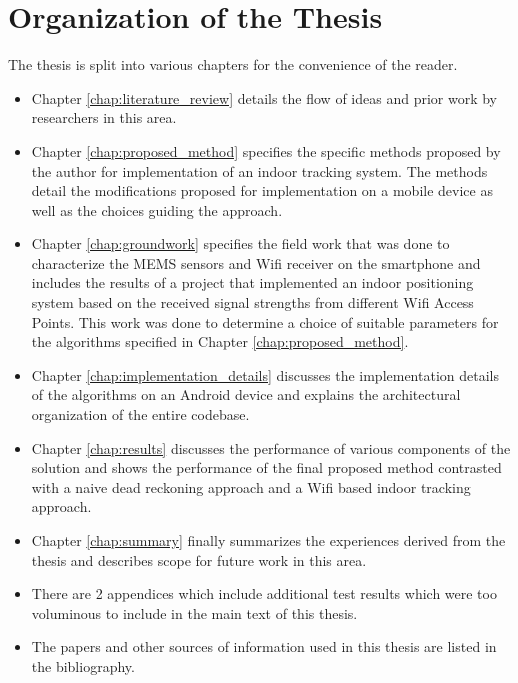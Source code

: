 \section{Organization of the Thesis}

The thesis is split into various chapters for the convenience of the reader.

\begin{itemize}
\item Chapter \ref{chap:literature_review} details the flow of ideas and prior
work by researchers in this area.

\item Chapter \ref{chap:proposed_method} specifies the specific methods proposed
by the author for implementation of an indoor tracking system. The methods
detail the modifications proposed for implementation on a mobile device as well
as the choices guiding the approach.

\item Chapter \ref{chap:groundwork} specifies the field work that was done to
characterize the MEMS sensors and Wifi receiver on the smartphone and includes
the results of a project that implemented an indoor positioning system based on
the received signal strengths from different Wifi Access Points. This work was
done to determine a choice of suitable parameters for the algorithms specified
in Chapter \ref{chap:proposed_method}.

\item Chapter \ref{chap:implementation_details} discusses the implementation
details of the algorithms on an Android device and explains the architectural
organization of the entire codebase.

\item Chapter \ref{chap:results} discusses the performance of various components
of the solution and shows the performance of the final proposed method
contrasted with a naive dead reckoning approach and a Wifi based indoor tracking
approach.

\item Chapter \ref{chap:summary} finally summarizes the experiences derived from
the thesis and describes scope for future work in this area.

\item There are 2 appendices which include additional test results which were
too voluminous to include in the main text of this thesis. 

\item The papers and other sources of information used in this thesis are listed
in the bibliography.
\end{itemize}
